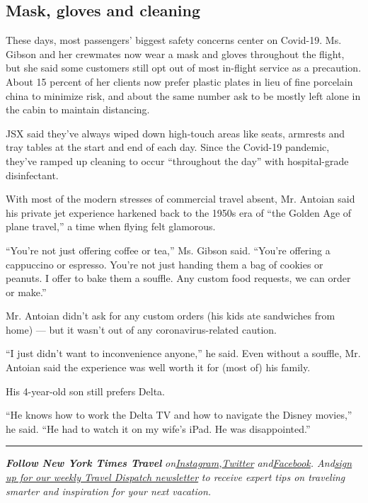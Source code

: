 \hypertarget{mask-gloves-and-cleaning}{%
\subsection{Mask, gloves and cleaning}\label{mask-gloves-and-cleaning}}

These days, most passengers' biggest safety concerns center on Covid-19.
Ms. Gibson and her crewmates now wear a mask and gloves throughout the
flight, but she said some customers still opt out of most in-flight
service as a precaution. About 15 percent of her clients now prefer
plastic plates in lieu of fine porcelain china to minimize risk, and
about the same number ask to be mostly left alone in the cabin to
maintain distancing.

JSX said they've always wiped down high-touch areas like seats, armrests
and tray tables at the start and end of each day. Since the Covid-19
pandemic, they've ramped up cleaning to occur ``throughout the day''
with hospital-grade disinfectant.

With most of the modern stresses of commercial travel absent, Mr.
Antoian said his private jet experience harkened back to the 1950s era
of ``the Golden Age of plane travel,'' a time when flying felt
glamorous.

``You're not just offering coffee or tea,'' Ms. Gibson said. ``You're
offering a cappuccino or espresso. You're not just handing them a bag of
cookies or peanuts. I offer to bake them a souffle. Any custom food
requests, we can order or make.''

Mr. Antoian didn't ask for any custom orders (his kids ate sandwiches
from home) --- but it wasn't out of any coronavirus-related caution.

``I just didn't want to inconvenience anyone,'' he said. Even without a
souffle, Mr. Antoian said the experience was well worth it for (most of)
his family.

His 4-year-old son still prefers Delta.

``He knows how to work the Delta TV and how to navigate the Disney
movies,'' he said. ``He had to watch it on my wife's iPad. He was
disappointed.''

\begin{center}\rule{0.5\linewidth}{\linethickness}\end{center}

\emph{\textbf{Follow New York Times Travel}}
\emph{on}\href{https://www.instagram.com/nytimestravel/}{\emph{Instagram}}\emph{,}\href{https://twitter.com/nytimestravel}{\emph{Twitter}}
\emph{and}\href{https://www.facebook.com/nytimestravel/}{\emph{Facebook}}\emph{.
And}\href{https://www.nytimes.com/newsletters/traveldispatch}{\emph{sign
up for our weekly Travel Dispatch newsletter}} \emph{to receive expert
tips on traveling smarter and inspiration for your next vacation.}

